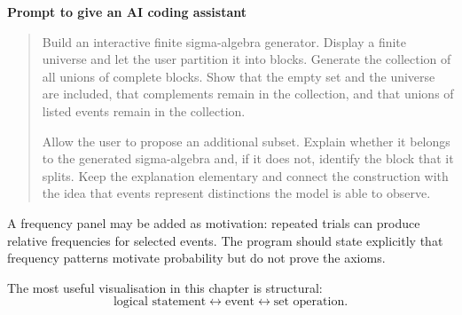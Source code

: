 \begin{examplebox}
\textbf{Prompt to give an AI coding assistant}

\begin{quote}\small
Build an interactive finite sigma-algebra generator. Display a finite universe and let the user partition it into blocks. Generate the collection of all unions of complete blocks. Show that the empty set and the universe are included, that complements remain in the collection, and that unions of listed events remain in the collection.

Allow the user to propose an additional subset. Explain whether it belongs to the generated sigma-algebra and, if it does not, identify the block that it splits. Keep the explanation elementary and connect the construction with the idea that events represent distinctions the model is able to observe.
\end{quote}
\end{examplebox}

A frequency panel may be added as motivation: repeated trials can produce relative frequencies for selected events. The program should state explicitly that frequency patterns motivate probability but do not prove the axioms.

\begin{summarybox}
The most useful visualisation in this chapter is structural:
\[
\text{logical statement}
\longleftrightarrow
\text{event}
\longleftrightarrow
\text{set operation}.
\]
\end{summarybox}
